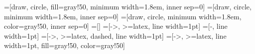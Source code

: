 \newcommand{\nodesize}{1.8em}
\newcommand{\edgeunit}{2.2*\nodesize}
=[draw, circle, fill=gray!50, minimum width=\nodesize, inner sep=0]
=[draw, circle, minimum width=\nodesize, inner sep=0]
=[draw, circle, minimum width=\nodesize, color=gray!50, inner sep=0]
=[]
=[->, >=latex, line width=1pt]
=[-, line width=1pt]
=[->, >=latex, dashed, line width=1pt]
=[->, >=latex, line width=1pt, fill=gray!50, color=gray!50]

